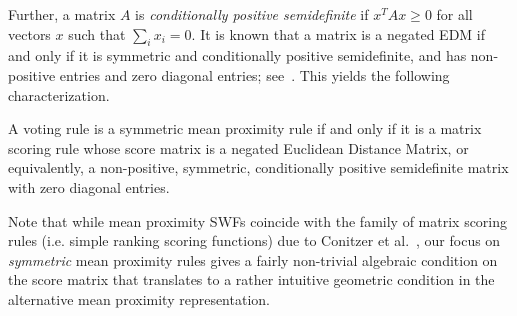 \documentclass[prodmode]{acmsmall-ec14}
\newcommand{\calL}{{\mathcal{L}}}
\newcommand{\rank}{{\calL(A)}}
\DeclareMathOperator*{\argmax}{arg\,max}
\DeclareMathOperator*{\argmin}{arg\,min}
\begin{document}
Further, a matrix $A$ is \emph{conditionally positive semidefinite} if $x^T A x \geq 0$ for all vectors $x$ such that $\sum_i x_i = 0$. It is known that a matrix is a negated EDM if and only if it is symmetric and conditionally positive semidefinite, and has non-positive entries and zero diagonal entries; see~\cite[Theorem 3.10]{ikramov2000conditionally}. %
This yields the following characterization. 
%
\begin{theorem}
A voting rule is a symmetric mean proximity rule if and only if it is a matrix scoring rule whose score matrix is a negated Euclidean Distance Matrix, or equivalently, a non-positive, symmetric, conditionally positive semidefinite matrix with zero diagonal entries.
\label{thm:symm}
\end{theorem}
%
Note that while mean proximity SWFs coincide with the family of matrix scoring rules (i.e. simple ranking scoring functions) due to Conitzer et al.~, our focus on \emph{symmetric} mean proximity rules gives a fairly non-trivial algebraic condition on the score matrix that translates to a rather intuitive geometric condition in the alternative mean proximity representation. 
\end{document}
